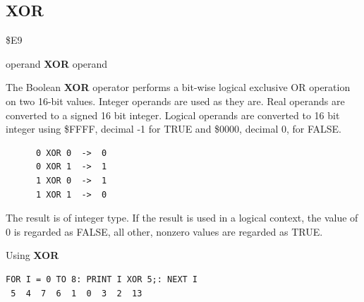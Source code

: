 \subsection{XOR}
\begin{description}[leftmargin=2cm,style=nextline]
\item [Token:] \$E9
\item [Format:] operand {\bf XOR} operand
\item [Usage:]  The Boolean {\bf XOR} operator performs a bit-wise
                logical exclusive OR operation on two 16-bit values.
                Integer operands are used as they are.
                Real operands are converted to a signed 16 bit integer.
                Logical operands are converted to 16 bit integer
                using \$FFFF, decimal -1 for TRUE
                and \$0000, decimal 0, for FALSE.

   \begin{verbatim}
      0 XOR 0  ->  0
      0 XOR 1  ->  1
      1 XOR 0  ->  1
      1 XOR 1  ->  0
   \end{verbatim}

\item [Remarks:] The result is of integer type.
                 If the result is used in a logical context,
                 the value of 0 is regarded as FALSE,
                 all other, nonzero values are regarded as TRUE.
\item [Example:] Using {\bf XOR}

\begin{tcolorbox}[colback=black,coltext=white]
\verbatimfont{\codefont}
\begin{verbatim}
FOR I = 0 TO 8: PRINT I XOR 5;: NEXT I
 5  4  7  6  1  0  3  2  13
\end{verbatim}
\end{tcolorbox}
\end{description}

